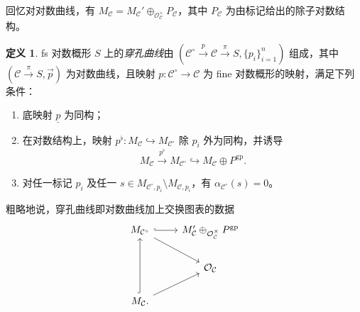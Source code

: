 \documentclass{amsart}
\theoremstyle{definition}
\newtheorem{defn}[thm]{定义}
\theoremstyle{remark}
\theoremstyle{plain}
\theoremstyle{definition}
\theoremstyle{remark}
\newcommand{\mc}[1]{\mathcal{#1}}
\newcommand{\mr}[1]{\mathrm{#1}}
\newcommand{\on}[1]{\operatorname{#1}}
\newcommand{\ul}[1]{\underline{#1}}
\newcommand{\1}{\mathbf{1}}
\newcommand{\2}{\mathbf{2}}
\newcommand{\3}{\mathbf{3}}
\begin{document}
回忆对对数曲线，有 \(M_{\mc{C}} = M_{\mc{C}}' \oplus_{\mc{O}_{\mc{C}}^{\times}} P_{\mc{C}}\)，其中 \(P_{\mc{C}}\) 为由标记给出的除子对数结构。

\begin{defn}
    fs 对数概形 \(S\) 上的\textit{穿孔曲线}由 \((\mc{C}^{\circ} \xrightarrow{p} \mc{C} \xrightarrow{\pi} S, \{p_i\}_{i=1}^n)\) 组成，其中 \((\mc{C} \xrightarrow{\pi} S, \vec{p})\) 为对数曲线，且映射 \(p \colon \mc{C}^{\circ} \to \mc{C}\) 为 fine 对数概形的映射，满足下列条件：
    \begin{enumerate}
        \item 底映射 \(\ul{p}\) 为同构；
        \item 在对数结构上，映射 \(p^{\flat} \colon M_{\mc{C}} \hookrightarrow M_{\mc{C}^{\circ}}\) 除 \(p_i\) 外为同构，并诱导
            \[ M_{\mc{C}} \xrightarrow{p^{\flat}} M_{\mc{C}^{\circ}} \hookrightarrow M_{\mc{C}} \oplus P^{\mr{gp}}. \]
        \item 对任一标记 \(p_i\) 及任一 \(s \in M_{\mc{C}^{\circ}, p_i} \setminus M_{\mc{C}, p_i}\)，有 \(\alpha_{\mc{C}^{\circ}}(s) = 0\)。
    \end{enumerate}
\end{defn}

粗略地说，穿孔曲线即对数曲线加上交换图表的数据
\begin{equation*}
\begin{tikzcd}
    M_{\mc{C}^{\circ}} \ar{dr} \ar[hookrightarrow]{r} & M_{\mc{C}}' \oplus_{\mc{O}_{\mc{C}}^{\times}} P^{\on{gp}} \\
    & \mc{O}_{\mc{C}} \\
    M_{\mc{C}} \ar[hookrightarrow]{uu} \ar{ur}.
\end{tikzcd}
\end{equation*}
\end{document}
